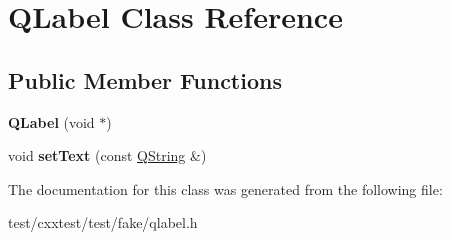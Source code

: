 \hypertarget{classQLabel}{\section{Q\-Label Class Reference}
\label{classQLabel}
}
\subsection*{Public Member Functions}
\begin{DoxyCompactItemize}
\item 
\hypertarget{classQLabel_a48316211cb628018ddc47a1aba2c2536}{{\bfseries Q\-Label} (void $\ast$)}\label{classQLabel_a48316211cb628018ddc47a1aba2c2536}

\item 
\hypertarget{classQLabel_a27fa17d64842d05faf5ff715fed25eb9}{void {\bfseries set\-Text} (const \hyperlink{classQString}{Q\-String} \&)}\label{classQLabel_a27fa17d64842d05faf5ff715fed25eb9}

\end{DoxyCompactItemize}


The documentation for this class was generated from the following file\-:\begin{DoxyCompactItemize}
\item 
test/cxxtest/test/fake/qlabel.\-h\end{DoxyCompactItemize}
